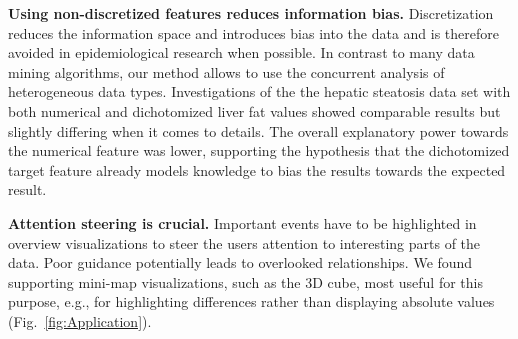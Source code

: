 \documentclass[journal]{style/vgtc} 			          %
\newcommand{\com}[1]{\textcolor{orange}{\uline{#1}}}
\begin{document}
\textbf{Using non-discretized features reduces information bias.}
Discretization reduces the information space and introduces bias into the data and is therefore avoided in epidemiological research when possible.
In contrast to many data mining algorithms, our method allows to use the concurrent analysis of heterogeneous data types.
Investigations of the the hepatic steatosis data set with both numerical and dichotomized liver fat values showed comparable results but slightly differing when it comes to details. %
The overall explanatory power towards the numerical feature was lower, supporting the hypothesis that the dichotomized target feature already models knowledge to bias the results towards the expected result.

\textbf{Attention steering is crucial.}
Important events have to be highlighted in overview visualizations to steer the users attention to interesting parts of the data.
Poor guidance potentially leads to overlooked relationships.
We found supporting mini-map visualizations, such as the 3D cube, most useful for this purpose, e.g., for highlighting differences rather than displaying absolute values (Fig.~\ref{fig:Application}).



\end{document}
